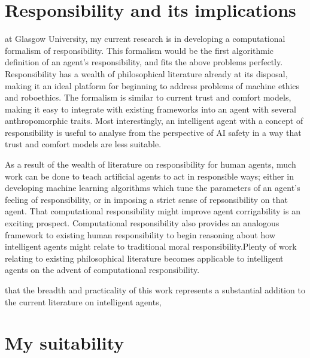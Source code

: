 \section{Responsibility and its implications}
 at Glasgow University, my current research is in developing a computational formalism of responsibility. This formalism would be the first algorithmic definition of an agent's responsibility, and fits the above problems perfectly. Responsibility has a wealth of philosophical literature already at its disposal, making it an ideal platform for beginning to address problems of machine ethics and roboethics. The formalism is similar to current trust and comfort models, making it easy to integrate with existing frameworks into an agent with several anthropomorphic traits. Most interestingly, an intelligent agent with a concept of responsibility is useful to analyse from the perspective of AI safety in a way that trust and comfort models are less suitable.\par

As a result of the wealth of literature on responsibility for human agents, much work can be done to teach artificial agents to act in responsible ways; either in developing machine learning algorithms which tune the parameters of an agent's feeling of responsibility, or in imposing a strict sense of repsonsibility on that agent.  That computational responsibility might improve agent corrigability\cite{corrigability} is an exciting prospect. Computational responsibility also provides an analogous framework to existing human responsibility to begin reasoning about how intelligent agents might relate to traditional moral responsibility.Plenty of work relating to existing philosophical literature becomes applicable to intelligent agents on the advent of computational responsibility.\par

 that the breadth and practicality of this work represents a substantial addition to the current literature on intelligent agents, 

\section{My suitability}






